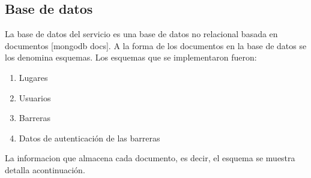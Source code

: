 \subsection{Base de datos}

La base de datos del servicio es una base de datos no relacional basada en documentos [mongodb docs]. A la forma de los documentos en la base de datos se los denomina esquemas. Los esquemas que se implementaron fueron:

\begin{enumerate}
        \item Lugares
        \item Usuarios
        \item Barreras
        \item Datos de autenticación de las barreras
\end{enumerate}

La informacion que almacena cada documento, es decir, el esquema se muestra detalla acontinuación.





